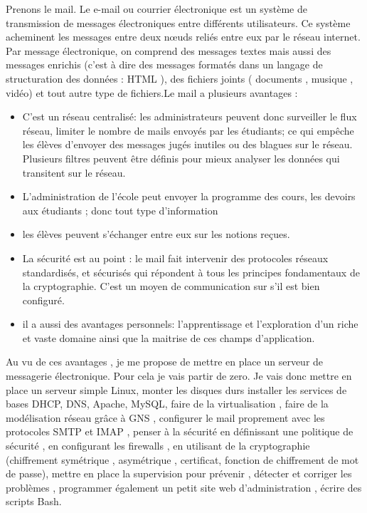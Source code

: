 \documentclass[a4paper,12pt,french]{report} %
\begin{document}
	Prenons le mail. Le e-mail ou courrier électronique est un système de transmission de messages électroniques entre différents utilisateurs. Ce système acheminent les messages entre deux nœuds reliés entre eux par le réseau internet. Par message électronique, on comprend des messages textes mais aussi des messages enrichis (c'est à dire des messages formatés dans un langage de structuration des données : HTML \label{ref:html} ), des fichiers joints ( documents , musique , vidéo) et tout autre type de fichiers.Le mail a plusieurs avantages :
\begin{itemize}
	\item C'est un réseau centralisé: les administrateurs peuvent donc surveiller le flux réseau, limiter le nombre de mails envoyés par les étudiants; ce qui empêche les élèves d'envoyer des messages jugés inutiles ou des blagues sur le réseau. Plusieurs filtres peuvent être définis pour mieux analyser les données qui transitent sur le réseau.
	\item L'administration de l'école peut envoyer la programme des cours, les devoirs aux étudiants ; donc tout type d'information
	\item les élèves peuvent s'échanger entre eux sur les notions reçues.
	\item La sécurité est au point : le mail fait intervenir des protocoles réseaux standardisés, et sécurisés qui répondent à tous les principes fondamentaux de la cryptographie. C'est un moyen de communication sur s'il est bien configuré. 
	\item il a aussi des avantages personnels: l'apprentissage et l'exploration d'un riche et vaste domaine ainsi que la maitrise de ces champs d'application.
\end{itemize}

	Au vu de ces avantages , je me propose de mettre en place un serveur de messagerie électronique.
Pour cela je vais partir de zero. Je vais donc mettre en place un serveur simple Linux, monter les disques durs installer les services de bases DHCP, DNS, Apache,  MySQL, faire de la virtualisation , faire de la modélisation réseau grâce à GNS , configurer le mail proprement avec les protocoles SMTP et IMAP , penser à la sécurité en définissant une politique de sécurité , en configurant les firewalls , en utilisant de la cryptographie (chiffrement symétrique , asymétrique , certificat, fonction de chiffrement de mot de passe),  mettre en place la supervision pour prévenir , détecter et corriger les problèmes , programmer également un petit site web d'administration , écrire des scripts Bash.  
\end{document}
